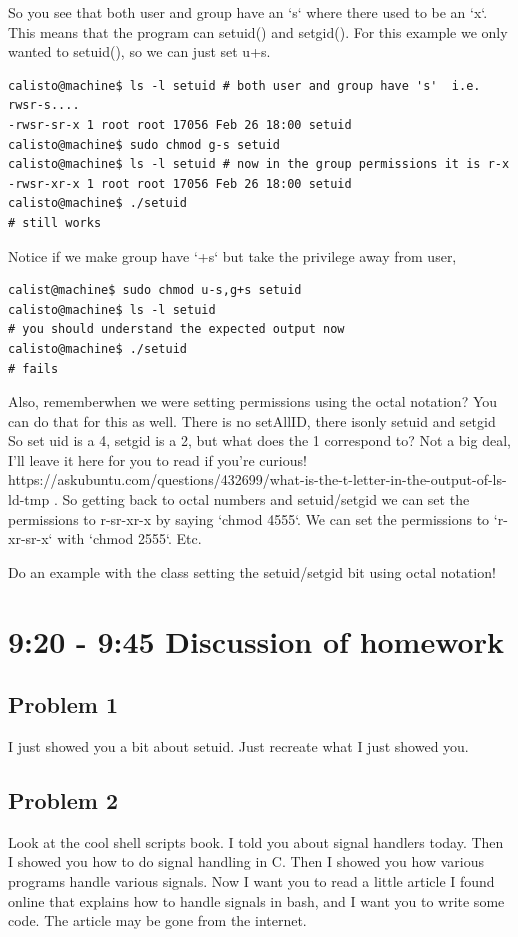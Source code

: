 \documentclass[8pt]{article}
\begin{document}
So you see that both user and group have an `s` where there used to be an `x`. This means that the program can setuid() and setgid(). For this example we only wanted to setuid(), so we can just set u+s. 

\begin{lstlisting}
calisto@machine$ ls -l setuid # both user and group have 's'  i.e. rwsr-s....
-rwsr-sr-x 1 root root 17056 Feb 26 18:00 setuid
calisto@machine$ sudo chmod g-s setuid
calisto@machine$ ls -l setuid # now in the group permissions it is r-x
-rwsr-xr-x 1 root root 17056 Feb 26 18:00 setuid
calisto@machine$ ./setuid
# still works
\end{lstlisting}

Notice if we make group have `+s` but take the privilege away from user, 

\begin{lstlisting}
calist@machine$ sudo chmod u-s,g+s setuid
calisto@machine$ ls -l setuid
# you should understand the expected output now
calisto@machine$ ./setuid
# fails
\end{lstlisting}

Also, rememberwhen we were setting permissions using the octal notation? You can do that for this as well. There is no setAllID, there isonly setuid and setgid
So set uid is a 4, setgid is a 2, but what does the 1 correspond to? Not a big deal, I'll leave it here for you to read if you're curious! https://askubuntu.com/questions/432699/what-is-the-t-letter-in-the-output-of-ls-ld-tmp . So getting back to octal numbers and setuid/setgid we can set the permissions to r-sr-xr-x by saying `chmod 4555`. We can set the permissions to `r-xr-sr-x` with `chmod 2555`. Etc.

{\Large Do an example with the class setting the setuid/setgid bit using octal
notation!}

\section{9:20 - 9:45 Discussion of homework}
\subsection{Problem 1}
I just showed you a bit about setuid. Just recreate what I just showed you.

\subsection{Problem 2}
Look at the cool shell scripts book. I told you about signal handlers today.
Then I showed you how to do signal handling in C. Then I showed you how various
programs handle various signals. Now I want you to read a little article I found
online that explains how to handle signals in bash, and I want you to write some
code. The article may be gone from the internet. 
\end{document}

